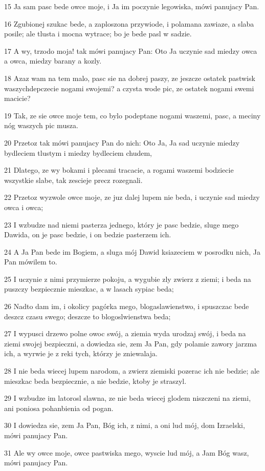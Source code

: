 \par 15 Ja sam pasc bede owce moje, i Ja im poczynie legowiska, mówi panujacy Pan.
\par 16 Zgubionej szukac bede, a zaploszona przywiode, i polamana zawiaze, a slaba posile; ale tlusta i mocna wytrace; bo je bede pasl w sadzie.
\par 17 A wy, trzodo moja! tak mówi panujacy Pan: Oto Ja uczynie sad miedzy owca a owca, miedzy barany a kozly.
\par 18 Azaz wam na tem malo, pasc sie na dobrej paszy, ze jeszcze ostatek pastwisk waszychdepczecie nogami swojemi? a czysta wode pic, ze ostatek nogami swemi macicie?
\par 19 Tak, ze sie owce moje tem, co bylo podeptane nogami waszemi, pasc, a meciny nóg waszych pic musza.
\par 20 Przetoz tak mówi panujacy Pan do nich: Oto Ja, Ja sad uczynie miedzy bydleciem tlustym i miedzy bydleciem chudem,
\par 21 Dlatego, ze wy bokami i plecami tracacie, a rogami waszemi bodziecie wszystkie slabe, tak zescieje precz rozegnali.
\par 22 Przetoz wyzwole owce moje, ze juz dalej lupem nie beda, i uczynie sad miedzy owca i owca;
\par 23 I wzbudze nad niemi pasterza jednego, który je pasc bedzie, sluge mego Dawida, on je pasc bedzie, i on bedzie pasterzem ich.
\par 24 A Ja Pan bede im Bogiem, a sluga mój Dawid ksiazeciem w posrodku nich, Ja Pan mówilem to.
\par 25 I uczynie z nimi przymierze pokoju, a wygubie zly zwierz z ziemi; i beda na puszczy bezpiecznie mieszkac, a w lasach sypiac beda;
\par 26 Nadto dam im, i okolicy pagórka mego, blogaslawienstwo, i spuszczac bede deszcz czasu swego; deszcze to blogoslwienstwa beda;
\par 27 I wypusci drzewo polne owoc swój, a ziemia wyda urodzaj swój, i beda na ziemi swojej bezpieczni, a dowiedza sie, zem Ja Pan, gdy polamie zawory jarzma ich, a wyrwie je z reki tych, którzy je zniewalaja.
\par 28 I nie beda wiecej lupem narodom, a zwierz ziemiski pozerac ich nie bedzie; ale mieszkac beda bezpiecznie, a nie bedzie, ktoby je straszyl.
\par 29 I wzbudze im latorosl slawna, ze nie beda wiecej glodem niszczeni na ziemi, ani poniosa pohanbienia od pogan.
\par 30 I dowiedza sie, zem Ja Pan, Bóg ich, z nimi, a oni lud mój, dom Izraelski, mówi panujacy Pan.
\par 31 Ale wy owce moje, owce pastwiska mego, wyscie lud mój, a Jam Bóg wasz, mówi panujacy Pan.

